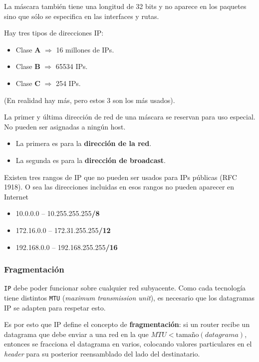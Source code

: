 \documentclass[]{article}
\begin{document}
La máscara también tiene una longitud de 32 bits y no aparece en los paquetes sino que sólo se especifica en las interfaces y rutas.


Hay tres tipos de direcciones IP:
\begin{itemize}
    \item Clase \textbf{A} $\Rightarrow$ 16 millones de IPs.
    \item Clase \textbf{B} $\Rightarrow$ 65534 IPs.
    \item Clase \textbf{C} $\Rightarrow$ 254 IPs.
\end{itemize}

(En realidad hay más, pero estos 3 son los más usados).


La primer y última dirección de red de una máscara se reservan para uso especial. No pueden ser asignadas a ningún host.

\begin{itemize}
    \item La primera es para la \textbf{dirección de la red}.
    \item La segunda es para la \textbf{dirección de broadcast}.
\end{itemize}

Existen tres rangos de IP que no pueden ser usados para IPs públicas (RFC 1918). O sea las direcciones incluidas en esos rangos no pueden aparecer en Internet
\begin{itemize}
    \item 10.0.0.0 – 10.255.255.255\textbf{/8}
    \item 172.16.0.0 – 172.31.255.255\textbf{/12}
    \item 192.168.0.0 – 192.168.255.255\textbf{/16}
\end{itemize}

\subsubsection{Fragmentación}
\texttt{IP} debe poder funcionar sobre cualquier red subyacente. Como cada tecnología tiene distintos \texttt{MTU} (\emph{maximum transmission unit}), es necesario que los datagramas IP se adapten para respetar esto.

Es por esto que IP define el concepto de \textbf{fragmentación}: si un router recibe un datagrama que debe enviar a una red en la que $MTU < \text{tamaño}(datagrama)$, entonces se fracciona el datagrama en varios, colocando valores particulares en el \emph{header} para su posterior reensamblado del lado del destinatario.
\end{document}
